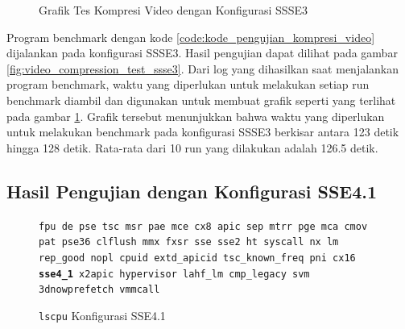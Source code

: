 \begin{figure}
    \centering
    \caption{Grafik Tes Kompresi Video dengan Konfigurasi SSSE3}
    \label{fig:video_compression_test_ssse3_graph}
\end{figure}

Program benchmark dengan kode \ref{code:kode_pengujian_kompresi_video} dijalankan pada konfigurasi SSSE3. Hasil pengujian dapat dilihat pada gambar \ref{fig:video_compression_test_ssse3}. Dari log yang dihasilkan saat menjalankan program benchmark, waktu yang diperlukan untuk melakukan setiap run benchmark diambil dan digunakan untuk membuat grafik seperti yang terlihat pada gambar \ref{fig:video_compression_test_ssse3_graph}. Grafik tersebut menunjukkan bahwa waktu yang diperlukan untuk melakukan benchmark pada konfigurasi SSSE3 berkisar antara 123 detik hingga 128 detik. Rata-rata dari 10 run yang dilakukan adalah 126.5 detik.

\subsection{Hasil Pengujian dengan Konfigurasi SSE4.1}
\begin{figure}
    \texttt{fpu de pse tsc msr pae mce cx8 apic sep mtrr pge mca cmov pat pse36 clflush mmx fxsr sse sse2 ht syscall nx lm rep\_good nopl cpuid extd\_apicid tsc\_known\_freq pni cx16 \textbf{sse4\_1} x2apic hypervisor lahf\_lm cmp\_legacy svm 3dnowprefetch vmmcall}
    \caption{\texttt{lscpu} Konfigurasi SSE4.1}
    \label{fig:lscpu_video_compression_test_sse4.1}
\end{figure}

